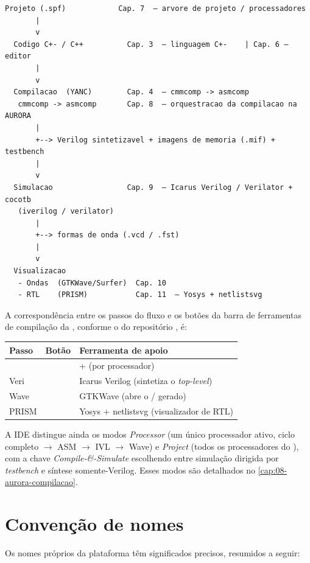 \begin{lstlisting}[caption={Fluxo conceitual de alto nível da plataforma SAPHO.},captionpos=b]
  Projeto (.spf)            Cap. 7  — arvore de projeto / processadores
       |
       v
  Codigo C+- / C++          Cap. 3  — linguagem C+-    | Cap. 6 — editor
       |
       v
  Compilacao  (YANC)        Cap. 4  — cmmcomp -> asmcomp
   cmmcomp -> asmcomp       Cap. 8  — orquestracao da compilacao na AURORA
       |
       +--> Verilog sintetizavel + imagens de memoria (.mif) + testbench
       |
       v
  Simulacao                 Cap. 9  — Icarus Verilog / Verilator + cocotb
   (iverilog / verilator)
       |
       +--> formas de onda (.vcd / .fst)
       |
       v
  Visualizacao
   - Ondas  (GTKWave/Surfer)  Cap. 10
   - RTL    (PRISM)           Cap. 11  — Yosys + netlistsvg
\end{lstlisting}

A correspondência entre os passos do fluxo e os botões da barra de ferramentas
de compilação da , conforme o  do repositório
, é:

\begin{tabularx}{\linewidth}{l l Y}
\toprule
\textbf{Passo} & \textbf{Botão} & \textbf{Ferramenta de apoio} \\
\midrule
\cmm{}  &   &  +  (por processador) \\
Veri    &  & Icarus Verilog (sintetiza o \emph{top-level}) \\
Wave    &  & GTKWave (abre o / gerado) \\
PRISM   & & Yosys + netlistsvg (visualizador de RTL) \\
\bottomrule
\end{tabularx}

A IDE distingue ainda os modos \emph{Processor} (um único processador ativo,
ciclo completo \cmm{} $\to$ ASM $\to$ IVL $\to$ Wave) e \emph{Project} (todos os
processadores do ), com a chave \emph{Compile-\&-Simulate} escolhendo
entre simulação dirigida por \emph{testbench} e síntese somente-Verilog. Esses
modos são detalhados no \autoref{cap:08-aurora-compilacao}.

\section{Convenção de nomes}
\label{sec:01-nomes}

Os nomes próprios da plataforma têm significados precisos, resumidos a seguir:

